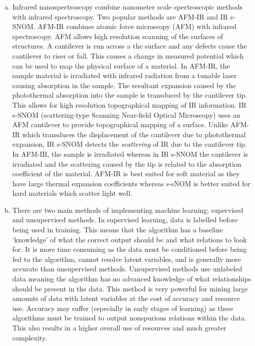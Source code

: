 \documentclass[titlepage]{article}
\begin{document}
\begin{enumerate}[a)]
    \item
    Infrared nanospectroscopy combine nanometer scale spectroscopic methods with infrared spectroscopy. 
    Two popular methods are AFM-IR and IR s-SNOM. AFM-IR combines atomic force microscopy (AFM)
    with infrared spectroscopy. AFM allows high resolution scanning of the surfaces of 
    structures. A cantilever is run across a the surface and any defects cause the cantilever 
    to riser or fall. This causes a change in measured potential which can be used to map the 
    physical surface of a material. In AFM-IR, the sample material is irradiated with infrared 
    radiation from a tunable laser causing absorption in the sample. The resultant expansion 
    caused by the photothermal absorption into the sample is transduced by the cantilever tip. 
    This allows for high resolution topographical mapping of IR information. IR s-SNOM (scattering-type Scanning Near-field Optical Microscopy) uses an AFM cantilever to provide topographical 
    mapping of a surface. Unlike AFM-IR which transduces the displacement of the cantilever 
    due to photothermal expansion, IR s-SNOM detects the \emph{scattering} of IR due to 
    the cantilever tip. In AFM-IR, the sample is irradiated whereas in IR s-SNOM the cantilever is 
    irradiated and the scattering caused by the tip is related to the absorption 
    coefficient of the material. AFM-IR is best suited for soft material 
    as they have large thermal expansion coefficients whereas s-sNOM is 
    better suited for hard materials which scatter light well.
    
    \item
    There are two main methods of implementing machine learning; supervised and unsupervised 
    methods. In supervised learning, data is labelled before being used in training. 
    This means that the algorithm has a baseline `knowledge' of what the correct output 
    should be and what relations to look for. It is more time consuming as the data must be conditioned
    before being fed to the algorithm, cannot resolve latent variables, and is generally 
    more accurate than unsupervised methods. Unsupervised methods use unlabeled data 
    meaning the algorithm has no advanced knowledge of what relationships should be present in the 
    data. This method is very powerful for mining large amounts of data with latent variables at the cost
    of accuracy and resource use. Accuracy may suffer (especially in early stages of learning) as these algorithms
    must be trained to output nonspurious relations within the data. This also results in a higher overall 
    use of resources and much greater complexity. 
\end{enumerate}
\end{document}
